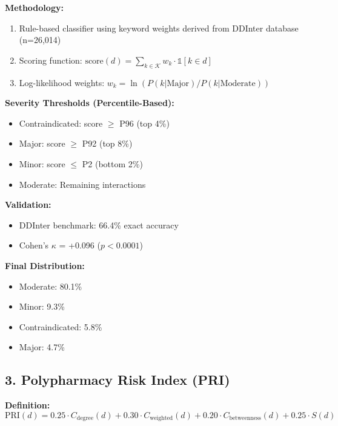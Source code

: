 \documentclass[11pt,a4paper]{article}
\begin{document}
\textbf{Methodology:}
\begin{enumerate}[label=(\roman*)]
    \item Rule-based classifier using keyword weights derived from DDInter database (n=26,014)
    \item Scoring function: $\text{score}(d) = \sum_{k \in \mathcal{K}} w_k \cdot \mathbb{1}[k \in d]$
    \item Log-likelihood weights: $w_k = \ln(P(k|\text{Major})/P(k|\text{Moderate}))$
\end{enumerate}

\textbf{Severity Thresholds (Percentile-Based):}
\begin{itemize}
    \item Contraindicated: score $\geq$ P96 (top 4\%)
    \item Major: score $\geq$ P92 (top 8\%)
    \item Minor: score $\leq$ P2 (bottom 2\%)
    \item Moderate: Remaining interactions
\end{itemize}

\textbf{Validation:}
\begin{itemize}
    \item DDInter benchmark: 66.4\% exact accuracy
    \item Cohen's $\kappa$ = +0.096 ($p < 0.0001$)
\end{itemize}

\textbf{Final Distribution:}
\begin{itemize}
    \item Moderate: 80.1\%
    \item Minor: 9.3\%
    \item Contraindicated: 5.8\%
    \item Major: 4.7\%
\end{itemize}

\subsection*{3. Polypharmacy Risk Index (PRI)}

\textbf{Definition:}
\begin{equation}
\text{PRI}(d) = 0.25 \cdot C_{\text{degree}}(d) + 0.30 \cdot C_{\text{weighted}}(d) + 0.20 \cdot C_{\text{betweenness}}(d) + 0.25 \cdot S(d)
\end{equation}
\end{document}
